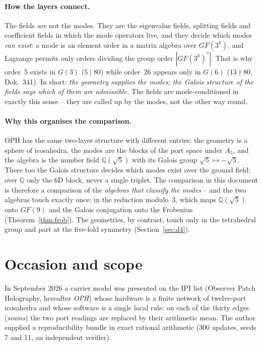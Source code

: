 \paragraph{How the layers connect.} The fields \emph{are} not the modes.
They are the eigenvalue fields, splitting fields and coefficient fields in
which the mode operators live, and they decide which modes \emph{can
exist}: a mode is an element order in a matrix algebra over $GF(3^k)$, and
Lagrange permits only orders dividing the group order $|GF(3^k)^*|$. That
is why order~5 exists in $G(3)$ ($5\mid80$) while order~26 appears only in
$G(6)$ ($13\nmid80$, Dok.~341). In short: \emph{the geometry supplies the
modes; the Galois structure of the fields says which of them are
admissible.} The fields are mode-conditioned in exactly this sense -- they
are called up by the modes, not the other way round.

\paragraph{Why this organises the comparison.} OPH has the same two-layer
structure with different entries: the geometry is a sphere of icosahedra,
the modes are the blocks of the port space under $A_5$, and the algebra is
the number field $\mathbb{Q}(\sqrt5)$ with its Galois group
$\sqrt5\mapsto-\sqrt5$. There too the Galois structure decides which modes
exist over the ground field: over $\mathbb{Q}$ only the 6D block, never a
single triplet. The comparison in this document is therefore a comparison
of the \emph{algebras that classify the modes} -- and the two algebras
touch exactly once: in the reduction modulo~3, which maps
$\mathbb{Q}(\sqrt5)$ onto $GF(9)$ and the Galois conjugation onto the
Frobenius (Theorem~\ref{thm:frob}). The geometries, by contrast, touch only
in the tetrahedral group and part at the five-fold symmetry
(Section~\ref{sec:d4}).

\section{Occasion and scope}

In September 2026 a carrier model was presented on the IPI list (Observer
Patch Holography, hereafter \emph{OPH}) whose hardware is a finite network
of twelve-port icosahedra and whose software is a single local rule: on
each of the thirty edges (\emph{seams}) the two port readings are replaced
by their arithmetic mean. The author supplied a reproducibility bundle in
exact rational arithmetic (300 updates, seeds 7 and 11, an independent
verifier).

